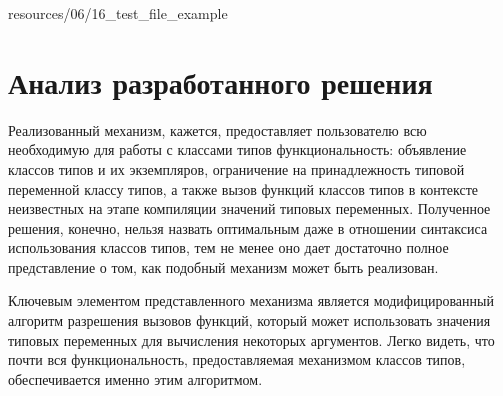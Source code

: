 
{resources/06/16_test_file_example}

\section{Анализ разработанного решения}

Реализованный механизм, кажется, предоставляет пользователю всю необходимую для работы с классами типов функциональность: объявление классов типов и их экземпляров, ограничение на принадлежность типовой переменной классу типов, а также вызов функций классов типов в контексте неизвестных на этапе компиляции значений типовых переменных. Полученное решения, конечно, нельзя назвать оптимальным даже в отношении синтаксиса использования классов типов, тем не менее оно дает достаточно полное представление о том, как подобный механизм может быть реализован. 

Ключевым элементом представленного механизма является модифицированный алгоритм разрешения вызовов функций, который может использовать значения типовых переменных для вычисления некоторых аргументов. Легко видеть, что почти вся функциональность, предоставляемая механизмом классов типов, обеспечивается именно этим алгоритмом. 


